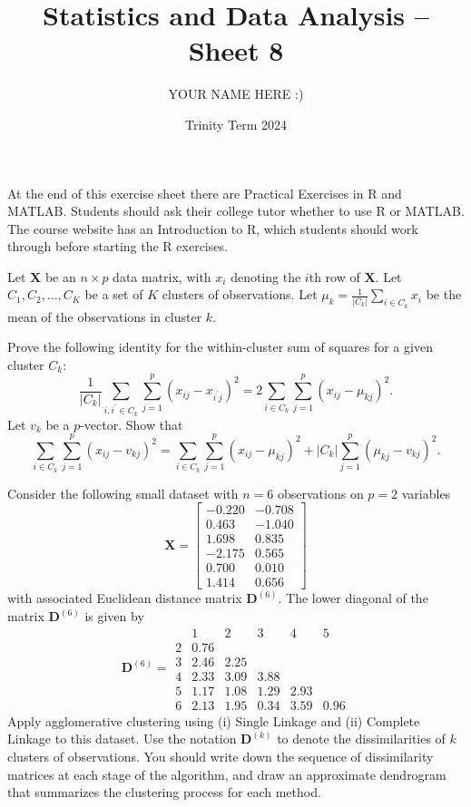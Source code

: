\documentclass[answers]{exam}
\title{Statistics and Data Analysis -- Sheet 8}
\author{YOUR NAME HERE :)}
\date{Trinity Term 2024}
\begin{document}
\maketitle
At the end of this exercise sheet there are Practical Exercises in R and MATLAB. Students should ask their college tutor whether to use R or MATLAB. The course website has an Introduction to R, which students should work through before starting the $\mathrm{R}$ exercises.
\begin{questions}
\question%
Let $\mathbf{X}$ be an $n \times p$ data matrix, with $x_{i}$ denoting the $i$th row of $\mathbf{X}$. Let $C_{1}, C_{2}, \ldots, C_{K}$ be a set of $K$ clusters of observations. Let $\mu_{k}=\frac{1}{\left|C_{k}\right|} \sum_{i \in C_{k}} x_{i}$ be the mean of the observations in cluster $k$.
\begin{subparts}
\subpart Prove the following identity for the within-cluster sum of squares for a given cluster $C_{k}$: \[
	\frac{1}{\left|C_{k}\right|} \sum_{i, i^{\prime} \in C_{k}} \sum_{j=1}^{p}\left(x_{i j}-x_{i^{\prime} j}\right)^{2}=2 \sum_{i \in C_{k}} \sum_{j=1}^{p}\left(x_{i j}-\mu_{k j}\right)^{2}.
\]
\subpart Let $v_{k}$ be a $p$-vector. Show that \[
	\sum_{i \in C_{k}} \sum_{j=1}^{p}\left(x_{i j}-v_{k j}\right)^{2}=\sum_{i \in C_{k}} \sum_{j=1}^{p}\left(x_{i j}-\mu_{k j}\right)^{2}+\left|C_{k}\right| \sum_{j=1}^{p}\left(\mu_{k j}-v_{k j}\right)^{2}.
\]
\end{subparts}



\question%
Consider the following small dataset with $n=6$ observations on $p=2$ variables \[
	\mathbf{X}=\left[\begin{array}{rr}
		-0.220 & -0.708 \\
		0.463 & -1.040 \\
		1.698 & 0.835 \\
		-2.175 & 0.565 \\
		0.700 & 0.010 \\
		1.414 & 0.656
	\end{array}\right]
\] with associated Euclidean distance matrix $\mathbf{D}^{(6)}$. The lower diagonal of the matrix $\mathbf{D}^{(6)}$ is given by \[
	\mathbf{D}^{(6)}=\begin{array}{c|ccccc} 
		  & 1    &    2 &    3 &    4 &    5 \\
		\hline
		2 & 0.76 &      &      &      &      \\
		3 & 2.46 & 2.25 &      &      &      \\
		4 & 2.33 & 3.09 & 3.88 &      &      \\
		5 & 1.17 & 1.08 & 1.29 & 2.93 &      \\
		6 & 2.13 & 1.95 & 0.34 & 3.59 & 0.96
	\end{array}
\] Apply agglomerative clustering using (i) Single Linkage and (ii) Complete Linkage to this dataset. Use the notation $\mathbf{D}^{(k)}$ to denote the dissimilarities of $k$ clusters of observations. You should write down the sequence of dissimilarity matrices at each stage of the algorithm, and draw an approximate dendrogram that summarizes the clustering process for each method.

\end{questions}
\end{document}

